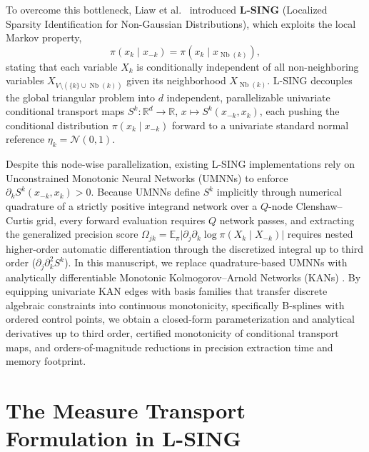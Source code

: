 \documentclass[11pt,a4paper]{article}
\theoremstyle{plain}
\theoremstyle{definition}
\theoremstyle{remark}
\begin{document}
To overcome this bottleneck, Liaw et al.\ \cite{liaw2025learning} introduced \textbf{L-SING} (Localized Sparsity Identification for Non-Gaussian Distributions), which exploits the local Markov property,
\begin{equation}
    \pi(x_k \mid x_{-k}) = \pi(x_k \mid x_{\operatorname{Nb}(k)}),
\end{equation}
stating that each variable $X_k$ is conditionally independent of all non-neighboring variables $X_{V \setminus (\{k\} \cup \operatorname{Nb}(k))}$ given its neighborhood $X_{\operatorname{Nb}(k)}$. L-SING decouples the global triangular problem into $d$ independent, parallelizable univariate conditional transport maps $S^k: \mathbb{R}^d \to \mathbb{R}$, $x \mapsto S^k(x_{-k}, x_k)$, each pushing the conditional distribution $\pi(x_k \mid x_{-k})$ forward to a univariate standard normal reference $\eta_k = \mathcal{N}(0, 1)$.

Despite this node-wise parallelization, existing L-SING implementations rely on Unconstrained Monotonic Neural Networks (UMNNs) \cite{wehenkel2019unconstrained} to enforce $\partial_k S^k(x_{-k}, x_k) > 0$. Because UMNNs define $S^k$ implicitly through numerical quadrature of a strictly positive integrand network over a $Q$-node Clenshaw--Curtis grid, every forward evaluation requires $Q$ network passes, and extracting the generalized precision score $\Omega_{jk} = \mathbb{E}_\pi\big|\partial_j \partial_k \log \pi(X_k \mid X_{-k})\big|$ requires nested higher-order automatic differentiation through the discretized integral up to third order ($\partial_j \partial_k^2 S^k$). In this manuscript, we replace quadrature-based UMNNs with analytically differentiable Monotonic Kolmogorov--Arnold Networks (KANs) \cite{liu2024kan, polomolina2025monokan}. By equipping univariate KAN edges with basis families that transfer discrete algebraic constraints into continuous monotonicity, specifically B-splines with ordered control points, we obtain a closed-form parameterization and analytical derivatives up to third order, certified monotonicity of conditional transport maps, and orders-of-magnitude reductions in precision extraction time and memory footprint.

\section{The Measure Transport Formulation in L-SING}
\end{document}

